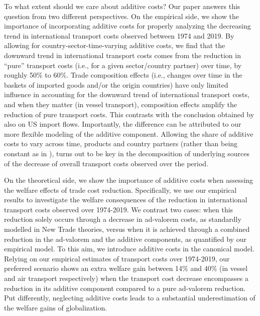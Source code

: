 \documentclass[a4paper,11pt]{article}
\begin{document}
To what extent should we care about additive costs? Our paper answers this question from two different perspectives.
On the empirical side, we show the importance of incorporating additive costs for properly analyzing the decreasing trend in international transport costs observed between 1974 and 2019. By allowing for country-sector-time-varying additive costs, we find that the downward trend in international transport costs comes from the reduction in ``pure'' transport costs (i.e., for a given sector/country partner) over time, by roughly 50\% to 60\%. Trade composition effects (i.e., changes over time in the baskets of imported goods and/or the origin countries) have only limited influence in accounting for the downward trend of international transport costs, and when they matter (in vessel transport), composition effects amplify the reduction of pure transport costs. This contrasts with the conclusion obtained by \cite{hummels2007} also on US import flows. Importantly, the difference can be attributed to our more flexible modeling of the additive component. Allowing the share of additive costs to vary across time, products and country partners (rather than being constant as in \citealp{hummels2007}), turns out to be key in the decomposition of underlying sources of the decrease of overall transport costs observed over the period.\smallskip

On the theoretical side, we show the importance of additive costs when assessing the welfare effects of trade cost reduction. Specifically, we use our empirical results to investigate the welfare consequences of the reduction in international transport costs observed over 1974-2019. We contrast two cases: when this reduction solely occurs through a decrease in ad-valorem costs, as standardly modelled in New Trade theories, versus when it is achieved through a combined reduction in the ad-valorem and the additive components, as quantified by our empirical model. To this aim, we introduce additive costs in the canonical \cite{melitz} model. Relying on our empirical estimates of transport costs
over 1974-2019, our preferred scenario shows an extra welfare gain between 14\% and 40\% (in vessel and air transport respectively) when the transport cost decrease encompasses a reduction in its additive component compared to a pure ad-valorem reduction. Put differently, neglecting additive costs leads to a substantial underestimation of the welfare gains of globalization.
\end{document}

